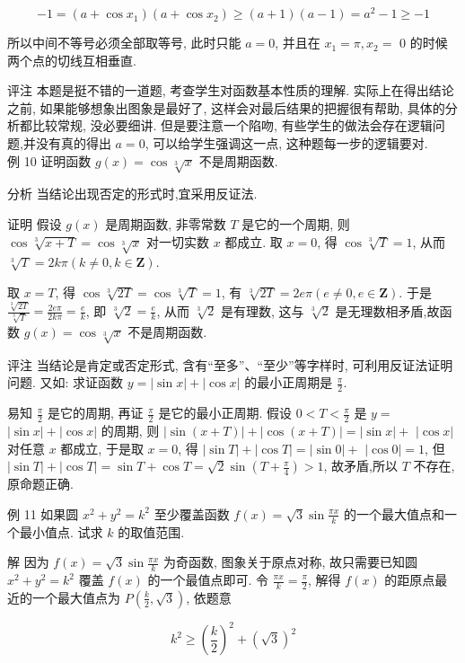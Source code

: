 	$$
		-1=\left(a+\cos x_{1}\right)\left(a+\cos x_{2}\right) \geqslant(a+1)(a-1)=a^{2}-1 \geqslant-1
	$$

	所以中间不等号必须全部取等号, 此时只能 $a=0$, 并且在 $x_{1}=\pi, x_{2}=$ 0 的时候两个点的切线互相垂直.

	评注 本题是挺不错的一道题, 考查学生对函数基本性质的理解. 实际上在得出结论之前, 如果能够想象出图象是最好了, 这样会对最后结果的把握很有帮助, 具体的分析都比较常规, 没必要细讲. 但是要注意一个陷吻, 有些学生的做法会存在逻辑问题,并没有真的得出 $a=0$, 可以给学生强调这一点, 这种题每一步的逻辑要对.\\
	例 10 证明函数 $g(x)=\cos \sqrt[3]{x}$ 不是周期函数.

	分析 当结论出现否定的形式时,宜采用反证法.

	证明 假设 $g(x)$ 是周期函数, 非零常数 $T$ 是它的一个周期, 则 $\cos \sqrt[3]{x+T}=\cos \sqrt[3]{x}$ 对一切实数 $x$ 都成立. 取 $x=0$, 得 $\cos \sqrt[3]{T}=1$, 从而 $\sqrt[3]{T}=2 k \pi(k \neq 0, k \in \mathbf{Z})$.

	取 $x=T$, 得 $\cos \sqrt[3]{2 T}=\cos \sqrt[3]{T}=1$, 有 $\sqrt[3]{2 T}=2 e \pi(e \neq 0, e \in \mathbf{Z})$. 于是 $\frac{\sqrt[3]{2 T}}{\sqrt[3]{T}}=\frac{2 e \pi}{2 k \pi}=\frac{e}{k}$, 即 $\sqrt[3]{2}=\frac{e}{k}$, 从而 $\sqrt[3]{2}$ 是有理数, 这与 $\sqrt[3]{2}$ 是无理数相矛盾,故函数 $g(x)=\cos \sqrt[3]{x}$ 不是周期函数.

	评注 当结论是肯定或否定形式, 含有“至多”、“至少”等字样时, 可利用反证法证明问题. 又如: 求证函数 $y=|\sin x|+|\cos x|$ 的最小正周期是 $\frac{\pi}{2}$.

	易知 $\frac{\pi}{2}$ 是它的周期, 再证 $\frac{\pi}{2}$ 是它的最小正周期. 假设 $0<T<\frac{\pi}{2}$ 是 $y=$ $|\sin x|+|\cos x|$ 的周期, 则 $|\sin (x+T)|+|\cos (x+T)|=|\sin x|+$ $|\cos x|$ 对任意 $x$ 都成立, 于是取 $x=0$, 得 $|\sin T|+|\cos T|=|\sin 0|+$ $|\cos 0|=1$, 但 $|\sin T|+|\cos T|=\sin T+\cos T=\sqrt{2} \sin \left(T+\frac{\pi}{4}\right)>1$, 故矛盾,所以 $T$ 不存在,原命题正确.

	例 11 如果圆 $x^{2}+y^{2}=k^{2}$ 至少覆盖函数 $f(x)=\sqrt{3} \sin \frac{\pi x}{k}$ 的一个最大值点和一个最小值点. 试求 $k$ 的取值范围.

	解 因为 $f(x)=\sqrt{3} \sin \frac{\pi x}{k}$ 为奇函数, 图象关于原点对称, 故只需要已知圆 $x^{2}+y^{2}=k^{2}$ 覆盖 $f(x)$ 的一个最值点即可. 令 $\frac{\pi x}{k}=\frac{\pi}{2}$, 解得 $f(x)$ 的距原点最近的一个最大值点为 $P\left(\frac{k}{2}, \sqrt{3}\right)$, 依题意

	$$
		k^{2} \geqslant\left(\frac{k}{2}\right)^{2}+(\sqrt{3})^{2}
	$$

